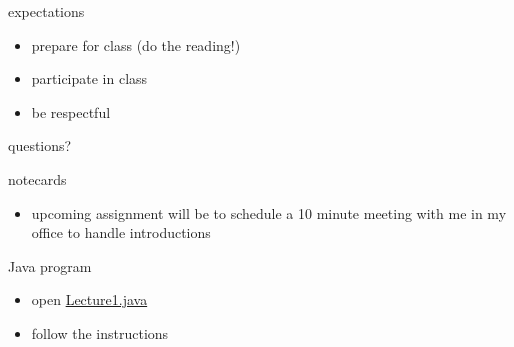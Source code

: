 \documentclass[10pt]{beamer}
\begin{document}
  \begin{frame}{expectations}
    \begin{itemize}
      \item prepare for class (do the reading!)
      \item participate in class
      \item be respectful
    \end{itemize}

  \end{frame}

  \begin{frame}[standout]
    questions?
  \end{frame}

  \appendix

  \begin{frame}{notecards}
    \begin{itemize}
      \item upcoming assignment will be to schedule a 10 minute meeting with me
        in my office to handle introductions
    \end{itemize}
  \end{frame}

  \begin{frame}{Java program}
    \begin{itemize}
      \item open \href{https://gist.github.com/jiverson002/19b476e9142ccff16b01f0692fa58666\#file-lecture1-java}{Lecture1.java}
      \item follow the instructions
    \end{itemize}
  \end{frame}
\end{document}
